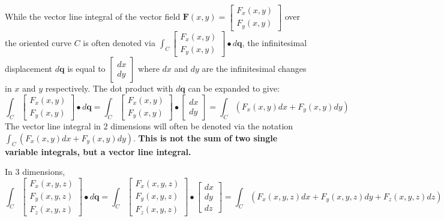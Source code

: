 \documentclass{article}
\begin{document}
While the vector line integral of the vector field \(\mathbf{F}(x, y) = \begin{bmatrix} F_x(x, y) \\ F_y(x, y) \end{bmatrix}\) over the oriented curve \(C\) is often denoted via \(\int_C \begin{bmatrix} F_x(x, y) \\ F_y(x, y) \end{bmatrix} \bullet d\mathbf{q}\), the infinitesimal displacement \(d\mathbf{q}\) is equal to \(\begin{bmatrix} dx \\ dy \end{bmatrix}\) where \(dx\) and \(dy\) are the infinitesimal changes in \(x\) and \(y\) respectively. The dot product with \(d\mathbf{q}\) can be expanded to give:
\[\int_C \begin{bmatrix} F_x(x, y) \\ F_y(x, y) \end{bmatrix} \bullet d\mathbf{q} = \int_C \begin{bmatrix} F_x(x, y) \\ F_y(x, y) \end{bmatrix} \bullet \begin{bmatrix} dx \\ dy \end{bmatrix} = \int_C (F_x(x,y)dx + F_y(x,y)dy)\]
The vector line integral in 2 dimensions will often be denoted via the notation \(\int_C (F_x(x,y)dx + F_y(x,y)dy)\). {\bf This is not the sum of two single variable integrals, but a vector line integral.} 

In 3 dimensions, 
\[\int_C \begin{bmatrix} F_x(x, y, z) \\ F_y(x, y, z) \\ F_z(x, y, z) \end{bmatrix} \bullet d\mathbf{q} = \int_C \begin{bmatrix} F_x(x, y, z) \\ F_y(x, y, z) \\ F_z(x, y, z) \end{bmatrix} \bullet \begin{bmatrix} dx \\ dy \\ dz \end{bmatrix} = \int_C (F_x(x,y,z)dx + F_y(x,y,z)dy + F_z(x,y,z)dz)\]
\end{document}

